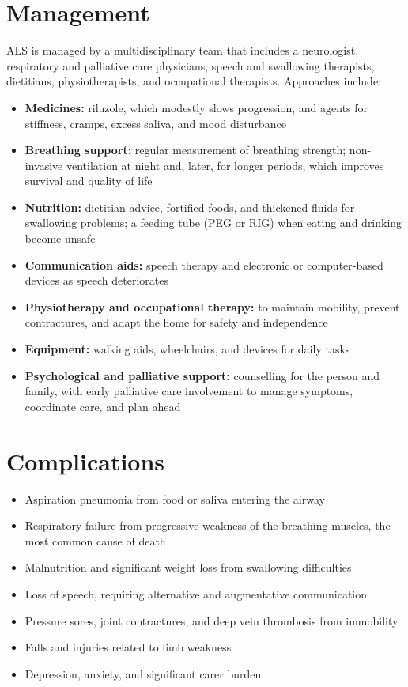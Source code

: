 \section*{Management}
ALS is managed by a multidisciplinary team that includes a neurologist, respiratory and palliative care physicians, speech and swallowing therapists, dietitians, physiotherapists, and occupational therapists. Approaches include:
\begin{itemize}
    \item \textbf{Medicines:} riluzole, which modestly slows progression, and agents for stiffness, cramps, excess saliva, and mood disturbance
    \item \textbf{Breathing support:} regular measurement of breathing strength; non-invasive ventilation at night and, later, for longer periods, which improves survival and quality of life
    \item \textbf{Nutrition:} dietitian advice, fortified foods, and thickened fluids for swallowing problems; a feeding tube (PEG or RIG) when eating and drinking become unsafe
    \item \textbf{Communication aids:} speech therapy and electronic or computer-based devices as speech deteriorates
    \item \textbf{Physiotherapy and occupational therapy:} to maintain mobility, prevent contractures, and adapt the home for safety and independence
    \item \textbf{Equipment:} walking aids, wheelchairs, and devices for daily tasks
    \item \textbf{Psychological and palliative support:} counselling for the person and family, with early palliative care involvement to manage symptoms, coordinate care, and plan ahead
\end{itemize}

\section*{Complications}
\begin{itemize}
    \item Aspiration pneumonia from food or saliva entering the airway
    \item Respiratory failure from progressive weakness of the breathing muscles, the most common cause of death
    \item Malnutrition and significant weight loss from swallowing difficulties
    \item Loss of speech, requiring alternative and augmentative communication
    \item Pressure sores, joint contractures, and deep vein thrombosis from immobility
    \item Falls and injuries related to limb weakness
    \item Depression, anxiety, and significant carer burden
\end{itemize}

